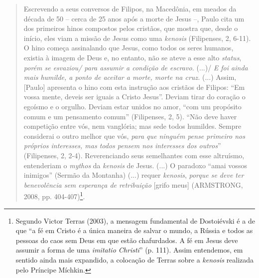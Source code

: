 \begin{quote}
Escrevendo a seus conversos de Filipos, na Macedônia, em meados da
década de 50 -- cerca de 25 anos após a morte de Jesus --, Paulo cita um
dos primeiros hinos compostos pelos cristãos, que mostra que, desde o
início, eles viam a missão de Jesus como uma \emph{kenosis} (Filipenses,
2, 6-11). O hino começa assinalando que Jesus, como todos os seres
humanos, existia à imagem de Deus e, no entanto, não se ateve a esse
alto \emph{status}, \emph{porém se esvaziou/ para assumir a condição de
escravo.} (...)/ \emph{E foi ainda mais humilde, a ponto de aceitar a
morte, morte na cruz.} (...) Assim, {[}Paulo{]} apresenta o hino com
esta instrução aos cristãos de Filipos: ``Em vossa mente, deveis ser
iguais a Cristo Jesus''. Deviam tirar do coração o egoísmo e o orgulho.
Deviam estar unidos no amor, ``com um propósito comum e um pensamento
comum'' (Filipenses, 2, 5). ``Não deve haver competição entre vós, nem
vanglória; mas sede todos humildes. Sempre considerai o outro melhor que
vós, \emph{para que ninguém pense primeiro nos próprios interesses, mas
todos pensem nos interesses dos outros}'' (Filipenses, 2, 2-4).
Reverenciando seus semelhantes com esse altruísmo, entenderiam o
\emph{mythos} da \emph{kenosis} de Jesus. (...) O paradoxo ``amai vossos
inimigos'' (Sermão da Montanha) (...) requer \emph{kenosis},
\emph{porque se deve ter benevolência sem esperança de retribuição}
{[}grifo meus{]} (ARMSTRONG, 2008, pp. 404-407)\footnote{Segundo Victor
  Terras (2003), a mensagem fundamental de Dostoiévski é a de que ``a fé
  em Cristo é a única maneira de salvar o mundo, a Rússia e todos as
  pessoas do caos sem Deus em que estão chafurdados. A fé em Jesus deve
  assumir a forma de uma \emph{imitatio Christi}'' (p. 111). Assim
  entendemos, em sentido ainda mais expandido, a colocação de Terras
  sobre a \emph{kenosis} realizada pelo Príncipe Míchkin.}.
\end{quote}


